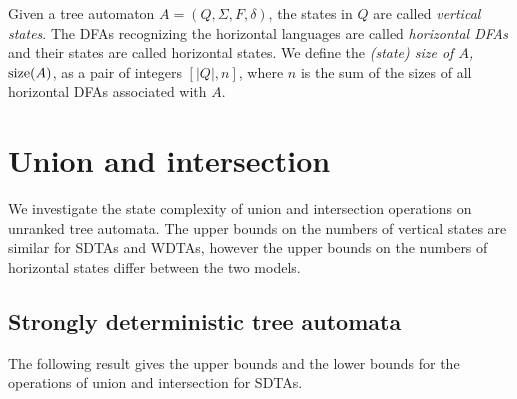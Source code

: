 \documentclass[copyright]{eptcs}
\begin{document}
Given a tree automaton $A=(Q,\Sigma,F,\delta)$, the states in $Q$
are called {\em vertical states\/}. The DFAs recognizing
the horizontal languages are called {\em horizontal
DFAs\/} and their states
 are called horizontal states.
We define the {\em (state) size of $A$,}  ${\rm
size}(A)$, as a pair of integers $[ |Q|, n ]$, where
$n$ is the sum of the sizes of all horizontal DFAs associated
with $A$.





\section{Union and intersection}

We investigate the state complexity of union and intersection
operations on unranked tree automata. The upper bounds on the
numbers of vertical states are similar for SDTAs and WDTAs,
however the upper bounds on the numbers of horizontal states
differ between the two models.

\subsection{Strongly deterministic tree automata}\label{sdta}












The following result gives the upper bounds and the lower bounds
for the operations of union and intersection for SDTAs.
\end{document}
